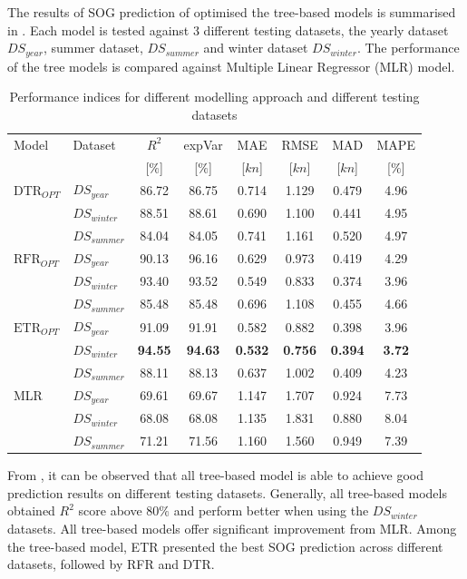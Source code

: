 The results of SOG prediction of optimised the tree-based models is summarised in . Each model is tested against 3 different testing datasets, the yearly dataset $DS_{year}$, summer dataset, $DS_{summer}$ and winter dataset $DS_{winter}$. The performance of the tree models is compared against Multiple Linear Regressor (MLR) model.

\begin{table}[ht]
    \footnotesize
    \centering
    {\begin{tabular}{ l l c c c c c c }
    \hline
    Model & Dataset & $R^2$ & expVar & MAE & RMSE & MAD & MAPE \\
    & & [$\%$] & [$\%$] & [$kn$] & [$kn$] & [$kn$] & [$\%$]  \\ 
    \hline
    $\text{DTR}_{OPT}$ & $DS_{year}$ & 86.72 & 86.75 & 0.714 & 1.129  & 0.479 & 4.96  \\
    & $DS_{winter}$ & 88.51 & 88.61 & 0.690 & 1.100 & 0.441 & 4.95 \\
    & $DS_{summer}$ & 84.04 & 84.05 & 0.741 & 1.161 & 0.520 & 4.97 \\
    $\text{RFR}_{OPT}$ & $DS_{year}$  & 90.13 & 96.16 & 0.629 & 0.973 & 0.419 & 4.29 \\
    & $DS_{winter}$ & 93.40 & 93.52 & 0.549 & 0.833 & 0.374 & 3.96 \\
    & $DS_{summer}$ & 85.48 & 85.48 & 0.696 & 1.108 & 0.455 & 4.66 \\
    $\text{ETR}_{OPT}$ & $DS_{year}$ & 91.09 & 91.91 & 0.582 & 0.882 & 0.398 & 3.96 \\
    & $DS_{winter}$ & \textbf{94.55} & \textbf{94.63} & \textbf{0.532} & \textbf{0.756} & \textbf{0.394} & \textbf{3.72} \\
    & $DS_{summer}$ & 88.11 & 88.13 & 0.637 & 1.002 & 0.409 & 4.23 \\
    MLR & $DS_{year}$ & 69.61 & 69.67 & 1.147 & 1.707 & 0.924 & 7.73 \\
    & $DS_{winter}$ & 68.08 & 68.08 & 1.135 & 1.831 & 0.880 & 8.04 \\
    & $DS_{summer}$ & 71.21 & 71.56 & 1.160 & 1.560 & 0.949 & 7.39 \\
    \hline
    \end{tabular}}
\caption{Performance indices for different modelling approach and different testing datasets}\label{tbl:testing_dataset_sog_result}
\end{table}

From , it can be observed that all tree-based model is able to achieve good prediction results on different testing datasets. Generally, all tree-based models obtained $R^2$ score above $80\%$ and perform better when using the $DS_{winter}$ datasets. All tree-based models offer significant improvement from MLR. Among the tree-based model, ETR presented the best SOG prediction across different datasets, followed by RFR and DTR.\\ 

